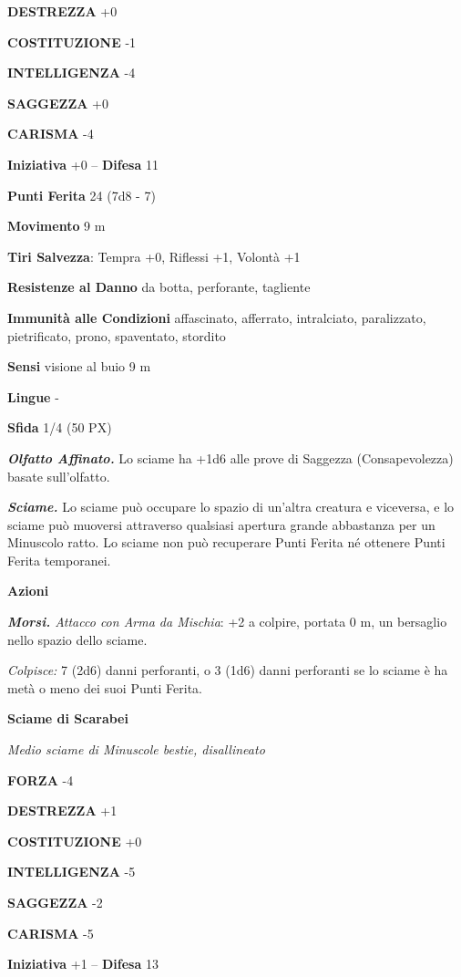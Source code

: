 \begin{multicols}{2}
	\textbf{DESTREZZA} +0

	\textbf{COSTITUZIONE} -1

	\textbf{INTELLIGENZA} -4

	\textbf{SAGGEZZA} +0

	\textbf{CARISMA} -4

	\textbf{Iniziativa} +0 -- \textbf{Difesa} 11

	\textbf{Punti Ferita} 24 (7d8 - 7)

	\textbf{Movimento} 9 m

	\textbf{Tiri Salvezza}: Tempra +0, Riflessi +1, Volontà +1

	\textbf{Resistenze al Danno} da botta, perforante, tagliente

	\textbf{Immunità alle Condizioni} affascinato, afferrato, intralciato, paralizzato, pietrificato, prono, spaventato, stordito

	\textbf{Sensi} visione al buio 9 m

	\textbf{Lingue} -

	\textbf{Sfida} 1/4 (50 PX)

	\textit{\textbf{Olfatto Affinato.}} Lo sciame ha +1d6 alle prove di Saggezza (Consapevolezza) basate sull'olfatto.

	\textit{\textbf{Sciame.}} Lo sciame può occupare lo spazio di un'altra creatura e viceversa, e lo sciame può muoversi attraverso qualsiasi apertura grande abbastanza per un Minuscolo ratto. Lo sciame non può recuperare Punti Ferita né ottenere Punti Ferita temporanei.

	\textbf{Azioni}

	\textit{\textbf{Morsi.} Attacco con Arma da Mischia}: +2 a colpire, portata 0 m, un bersaglio nello spazio dello sciame.

	\textit{Colpisce:} 7 (2d6) danni perforanti, o 3 (1d6) danni perforanti se lo sciame è ha metà o meno dei suoi Punti Ferita.

	\medskip\textbf{Sciame di Scarabei}

	\textit{Medio sciame di Minuscole bestie, disallineato}

	\textbf{FORZA} -4

	\textbf{DESTREZZA} +1

	\textbf{COSTITUZIONE} +0

	\textbf{INTELLIGENZA} -5

	\textbf{SAGGEZZA} -2

	\textbf{CARISMA} -5

	\textbf{Iniziativa} +1 -- \textbf{Difesa} 13


\end{multicols}
